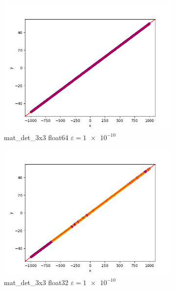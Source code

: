 \documentclass[11pt,a4paper]{article}
\begin{document}
\begin{figure}[H]
    \centering
    \begin{subfigure}[b]{0.46\textwidth}
        \centering
        \includegraphics[scale=0.4]{res/lin_mat_det_3x3_float64_1e-10.png}
        \caption{\ttfamily\arraybackslash mat\_det\_3x3 float64 $\varepsilon=\num{1e-10}$}
    \end{subfigure}
    \begin{subfigure}[b]{0.46\textwidth}
        \centering
        \includegraphics[scale=0.4]{res/lin_mat_det_3x3_float32_1e-10.png}
        \caption{\ttfamily\arraybackslash mat\_det\_3x3 float32 $\varepsilon=\num{1e-10}$}
    \end{subfigure}
    \begin{subfigure}[b]{0.46\textwidth}

\end{subfigure}
\end{figure}
\end{document}
